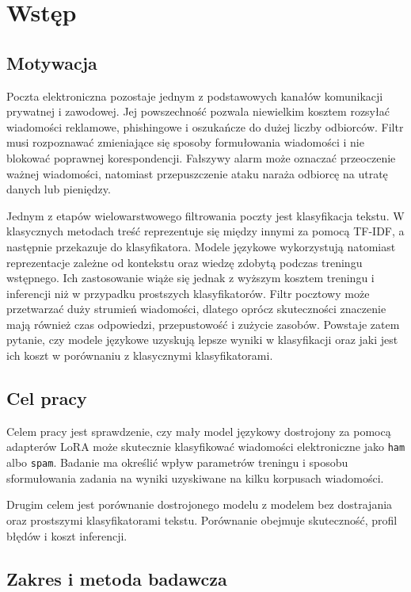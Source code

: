 \chapter{Wstęp}

\section{Motywacja}

Poczta elektroniczna pozostaje jednym z podstawowych kanałów komunikacji
prywatnej i zawodowej. Jej powszechność pozwala niewielkim kosztem rozsyłać
wiadomości reklamowe, phishingowe i oszukańcze do dużej liczby odbiorców.
Filtr musi rozpoznawać zmieniające się sposoby formułowania wiadomości i nie
blokować poprawnej korespondencji. Fałszywy alarm może oznaczać przeoczenie
ważnej wiadomości, natomiast przepuszczenie ataku naraża odbiorcę na utratę
danych lub pieniędzy.

Jednym z etapów wielowarstwowego filtrowania poczty jest klasyfikacja tekstu.
W klasycznych metodach treść reprezentuje się między innymi za pomocą TF-IDF,
a następnie przekazuje do klasyfikatora. Modele językowe wykorzystują natomiast
reprezentacje zależne od kontekstu oraz wiedzę zdobytą podczas treningu
wstępnego. Ich zastosowanie wiąże się jednak z wyższym kosztem treningu i
inferencji niż w przypadku prostszych klasyfikatorów. Filtr pocztowy może
przetwarzać duży strumień wiadomości, dlatego oprócz skuteczności znaczenie mają
również czas odpowiedzi, przepustowość i zużycie zasobów. Powstaje zatem
pytanie, czy modele językowe uzyskują lepsze wyniki w klasyfikacji oraz jaki
jest ich koszt w porównaniu z klasycznymi klasyfikatorami.

\section{Cel pracy}

Celem pracy jest sprawdzenie, czy mały model językowy dostrojony za pomocą
adapterów LoRA może skutecznie klasyfikować wiadomości elektroniczne jako
\texttt{ham} albo \texttt{spam}. Badanie ma określić wpływ parametrów treningu
i sposobu sformułowania zadania na wyniki uzyskiwane na kilku korpusach
wiadomości.

Drugim celem jest porównanie dostrojonego modelu z modelem bez dostrajania oraz
prostszymi klasyfikatorami tekstu. Porównanie obejmuje skuteczność, profil
błędów i koszt inferencji.

\section{Zakres i metoda badawcza}

